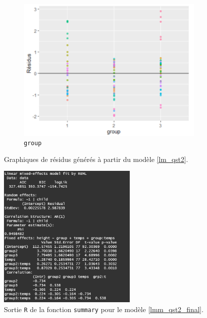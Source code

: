 \documentclass{article}
\begin{document}
\begin{figure}[H]
\begin{subfigure}{0.48\textwidth}
		\includegraphics[width=1\textwidth]{graphiques/Residus_VS_group_qst2}
		\caption{\texttt{group}}
		\label{Residus_VS_group_qst2}
	\end{subfigure}
	\caption{Graphiques de résidus générés à partir du modèle \eqref{lm_qst2}.}
	\label{residus_qst2}
\end{figure}

\begin{figure}[H]  %
	\centering
	\includegraphics[width=0.6\textwidth]{graphiques/summary_Qst2}
	\caption{Sortie \texttt{R} de la fonction \texttt{summary} pour le modèle \eqref{lmm_qst2_final}.}
	\label{summary_Qst2}
\end{figure}

	
\end{document}
